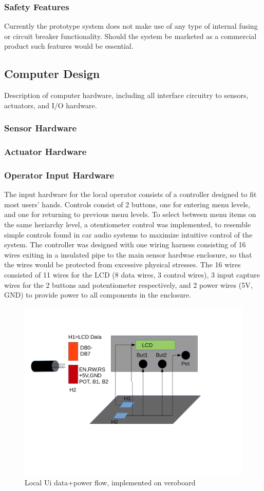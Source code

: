 \documentclass[]{report}
\begin{document}
\subsubsection{Safety Features}
Currently the prototype system does not make use of any type of internal fusing or circuit breaker functionality. Should the system be marketed as a commercial product such features would be essential.

\subsection{Computer Design}
Description of computer hardware, including all interface circuitry to sensors, actuators, and I/O hardware.

\subsubsection{Sensor Hardware}

\subsubsection{Actuator Hardware}

\subsubsection{Operator Input Hardware}
The input hardware for the local operator consists of a controller designed to fit most users' hands. Controls consist of 2 buttons, one for entering menu levels, and one for returning to previous menu levels. To select between menu items on the same heriarchy level, a otentiometer control was implemented, to resemble simple controls found in car audio systems to maximize intuitive control of the system. The controller was designed with one wiring harness consisting of 16 wires exiting in a insulated pipe to the main sensor hardwae enclosure, so that the wires would be protected from excessive physical stresses. The 16 wires consisted of 11 wires for the LCD (8 data wires, 3 control wires), 3 input capture wires for the 2 buttons and potentiometer respectively, and 2 power wires (5V, GND) to provide power to all components in the enclosure.
\begin{figure}[h]
\centering
\includegraphics[width=0.7\linewidth]{"../Diagrams/localUi"}
\caption[State Diagram]{Local Ui data+power flow, implemented on veroboard}
\label{fig:localUiDiagram}
\end{figure}
\end{document}
